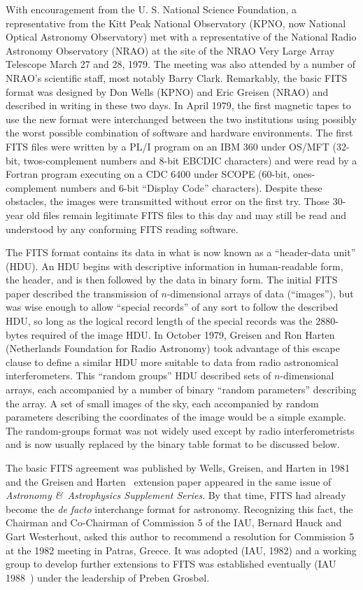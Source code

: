 \documentclass[twoside]{article}
\begin{document}
With encouragement from the U. S. National Science Foundation, a
representative from the Kitt Peak National Observatory (KPNO, now
National Optical Astronomy Observatory) met with a representative of
the National Radio Astronomy Observatory (NRAO) at the site of the
NRAO Very Large Array Telescope March 27 and 28, 1979.  The meeting
was also attended by a number of NRAO's scientific staff, most
notably Barry Clark.  Remarkably, the basic FITS format was
designed by Don Wells (KPNO) and Eric Greisen (NRAO) and described in
writing in these two days.  In April 1979, the first magnetic tapes to
use the new format were interchanged between the two institutions
using possibly the worst possible combination of software and hardware
environments.  The first FITS files were written by a PL/I program on
an IBM 360 under OS/MFT (32-bit, twos-complement numbers and 8-bit
EBCDIC characters) and were read by a Fortran program executing on a
CDC 6400 under SCOPE (60-bit, ones-complement numbers and 6-bit
``Display Code'' characters).  Despite these obstacles, the images
were transmitted without error on the first try.  Those 30-year old
files remain legitimate FITS files to this day and may still be read
and understood by any conforming FITS reading software.

The FITS format contains its data in what is now known as a
``header-data unit'' (HDU)\@.  An HDU begins with descriptive
information in human-readable form, the header, and is then followed
by the data in binary form.  The initial FITS paper described the
transmission of $n$-dimensional arrays of data (``images''), but
was wise enough to allow ``special records'' of any sort to follow the
described HDU, so long as the logical record length of the special
records was the 2880-bytes required of the image HDU.  In October
1979, Greisen and Ron Harten (Netherlands Foundation for Radio
Astronomy) took advantage of this escape clause to define a similar
HDU more suitable to data from radio astronomical interferometers.
This ``random groups'' HDU described sets of $n$-dimensional
arrays, each accompanied by a number of binary ``random parameters''
describing the array.  A set of small images of the sky, each
accompanied by random parameters describing the coordinates of the
image would be a simple example.  The random-groups format was not
widely used except by radio interferometrists and is now usually
replaced by the binary table format to be discussed below.

The basic FITS agreement was published by Wells, Greisen, and Harten
in 1981~\cite{WGH81} and the Greisen and Harten~\cite{GH81} extension
paper appeared in the same issue of {\it Astronomy \&\ Astrophysics
  Supplement Series}.  By that time, FITS had already become the {\it
  de facto} interchange format for astronomy.  Recognizing this fact,
the Chairman and Co-Chairman of Commission 5 of the IAU, Bernard Hauck
and Gart Westerhout, asked this author to recommend a resolution for
Commission 5 at the 1982 meeting in Patras, Greece.  It was adopted
(IAU, 1982\cite{IAU82}) and a working group to develop further
extensions to FITS was established eventually (IAU 1988~\cite{IAU88})
under the leadership of Preben Grosb\o l.
\end{document}
